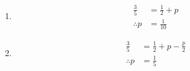 \begin{enumerate}
	\item 
\begin{align}
\frac{3}{5}&=\frac{1}{2}+p&
\\
\therefore  p &= \frac{1}{10}&
\end{align}
\item 
\begin{align}
\frac{3}{5}&=\frac{1}{2}+ p - \frac{p}{2}&
\\
\therefore p &= \frac{1}{5}&
\end{align}
\end{enumerate}
